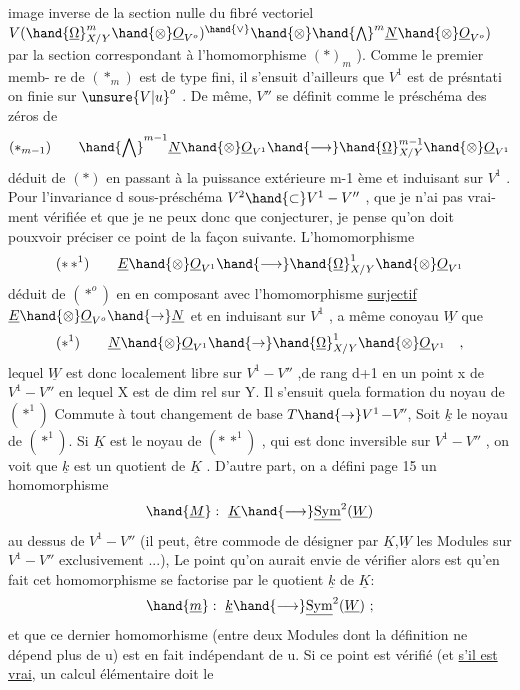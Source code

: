 
image inverse de la section nulle du fibré vectoriel $V(\hand{\underline{\Omega}}^m_{X/Y}\hand{\otimes}\underline{O}_{V^o})^{\hand{\vee}}\hand{\otimes}\hand{\bigwedge}^m\underline{N}\hand{\otimes}\underline{O}_{V^o})$
par la section correspondant à l'homomorphisme $(*)_{m}$ ). Comme le premier memb-%
re de $(*_m)$ est de type fini, il s'ensuit d'ailleurs que $V^1$ est de présntati%
on finie sur $\unsure{V|u}^o$ . De même, $V''$ se définit comme le préschéma des zéros de
\[ (*_{m-1}) \qquad \hand{\bigwedge}^{m-1}\underline{N}\hand{\otimes}\underline{O}_{V^1} \hand{\longrightarrow} \hand{\underline{\Omega}}^{m-1}_{X/Y}\hand{\otimes}\underline{O}_{V^1} \]
déduit de $(*)$ en passant à la puissance extérieure m-1 ème et induisant sur
$V^1$ . Pour l'invariance d sous-préschéma $V^2\hand{\subset} V^1-V''$ , que je n'ai pas vrai-%
ment vérifiée et que je ne peux donc que conjecturer, je pense qu'on doit
pouxvoir préciser ce point de la façon suivante. L'homomorphisme
\[ (*\,*^1) \qquad \underline{E}\hand{\otimes}\underline{O}_{V^1}\hand{\longrightarrow}\hand{\underline{\Omega}}^1_{X/Y}\hand{\otimes}\underline{O}_{V^1} \]
déduit de $(*^o)$ en  en composant avec l'homomorphisme
\uline{surjectif} $\underline{E}\hand{\otimes}\underline{O}_{V^o}\hand{\to}\underline{N}$ et en  induisant sur $V^1$ , a même conoyau
$\underline{W}$ que
\[ (*^1) \qquad \underline{N}\hand{\otimes}\underline{O}_{V^1}\hand{\to}\hand{\underline{\Omega}}^1_{X/Y}\hand{\otimes}\underline{O}_{V^1} \quad , \]
lequel $\underline{W}$ est donc localement libre sur $V^1-V''$ ,\hand{(}de rang d+1 en un point
x de $V^1-V''$ en lequel X est de dim rel  sur Y\hand{)}. Il s'ensuit quela formation
du noyau de $(*^1)$ Commute à tout changement de base $T\hand{\to} V^1$$-V''$, Soit $\underline{k}$ le
noyau de $(*^1)$. Si $\underline{K}$ est le noyau de $(*\,*^1)$ , qui est donc inversible sur
$V^1-V''$ , on voit  que $\underline{k}$ est un quotient de $\underline{K}$ . D'autre part, on a défini
page 15 un homomorphisme
\[ \hand{\underline{M}} : \ \underline{K}\hand{\longrightarrow}\underline{\mathrm{Sym}}^2(\underline{W}) \]
au dessus de $V^1-V''$ (il peut, être commode de désigner par $\underline{K}$,$\underline{W}$ les Modules
sur $V^1-V''$ exclusivement ...),  Le point qu'on aurait envie de vérifier
alors est qu'en fait cet homomorphisme se factorise par le quotient $\underline{k}$ de $\underline{K}$:
\[ \hand{\underline{m}} : \ \underline{k}\hand{\longrightarrow}\underline{\mathrm{Sym}}^2(\underline{W}) \  ; \]
et que ce dernier homomorhisme (entre deux Modules dont la définition ne
 dépend plus de u) est en fait indépendant de
u. Si ce point est vérifié (et \uline{s'il est vrai}, un calcul élémentaire doit le

